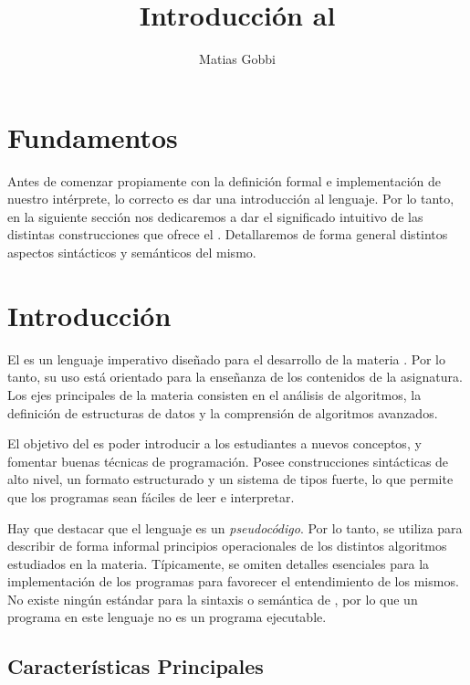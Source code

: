 \documentclass{article}
\begin{document}
\title{Introducción al \Lang}
\author{Matias Gobbi}
\maketitle

\section*{Fundamentos}

Antes de comenzar propiamente con la definición formal e implementación de nuestro intérprete, lo correcto es dar una introducción al lenguaje.
Por lo tanto, en la siguiente sección nos dedicaremos a dar el significado intuitivo de las distintas construcciones que ofrece el \Lang.
Detallaremos de forma general distintos aspectos sintácticos y semánticos del mismo.

\section{Introducción}

El \Lang\space es un lenguaje imperativo diseñado para el desarrollo de la materia \Mat.
Por lo tanto, su uso está orientado para la enseñanza de los contenidos de la asignatura.
Los ejes principales de la materia consisten en el análisis de algoritmos, la definición de estructuras de datos y la comprensión de algoritmos avanzados.

El objetivo del \Lang\space es poder introducir a los estudiantes a nuevos conceptos, y fomentar buenas técnicas de programación.
Posee construcciones sintácticas de alto nivel, un formato estructurado y un sistema de tipos fuerte, lo que permite que los programas sean fáciles de leer e interpretar.

Hay que destacar que el lenguaje es un \textit{pseudocódigo}.
Por lo tanto, se utiliza para describir de forma informal principios operacionales de los distintos algoritmos estudiados en la materia.
Típicamente, se omiten detalles esenciales para la implementación de los programas para favorecer el entendimiento de los mismos.
No existe ningún estándar para la sintaxis o semántica de \Lang, por lo que un programa en este lenguaje no es un programa ejecutable. 

\subsection{Características Principales}
\end{document}
